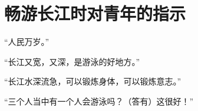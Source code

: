 \section[畅游长江时对青年的指示（一九六六年七月十七日上午）]{畅游长江时对青年的指示}


“人民万岁。”

“长江又宽，又深，是游泳的好地方。”

“长江水深流急，可以锻炼身体，可以锻炼意志。”

“三个人当中有一个人会游泳吗？（答有）这很好！”

